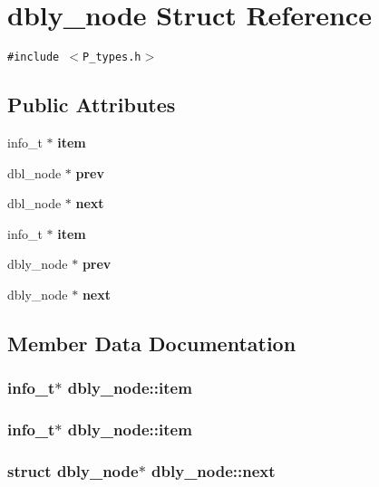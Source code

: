 \section{dbly\_\-node  Struct Reference}
\label{structdbly__node}
{\tt \#include $<$P\_\-types.h$>$}

\subsection*{Public Attributes}
\begin{CompactItemize}
\item 
info\_\-t $\ast$ {\bf item}
\item 
dbl\_\-node $\ast$ {\bf prev}
\item 
dbl\_\-node $\ast$ {\bf next}
\item 
info\_\-t $\ast$ {\bf item}
\item 
dbly\_\-node $\ast$ {\bf prev}
\item 
dbly\_\-node $\ast$ {\bf next}
\end{CompactItemize}


\subsection{Member Data Documentation}
\subsubsection{\setlength{\rightskip}{0pt plus 5cm}info\_\-t$\ast$ dbly\_\-node::item}\label{structdbly__node_m3}


\subsubsection{\setlength{\rightskip}{0pt plus 5cm}info\_\-t$\ast$ dbly\_\-node::item}\label{structdbly__node_m0}


\subsubsection{\setlength{\rightskip}{0pt plus 5cm}struct dbly\_\-node$\ast$ dbly\_\-node::next}\label{structdbly__node_m5}


